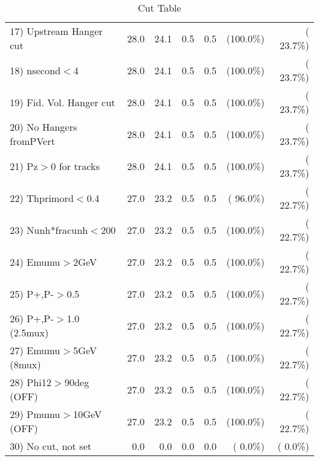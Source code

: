 \begin{table}[h!]
\begin{tabular}{||l||r|r|r|r|r|r||}
 17) Upstream Hanger cut  &         28.0 &         24.1 &          0.5 &          0.5 & (100.0\%) & ( 23.7\%) \\
 18) nsecond$<$4          &         28.0 &         24.1 &          0.5 &          0.5 & (100.0\%) & ( 23.7\%) \\
 19) Fid. Vol. Hanger cut &         28.0 &         24.1 &          0.5 &          0.5 & (100.0\%) & ( 23.7\%) \\
 20) No Hangers fromPVert &         28.0 &         24.1 &          0.5 &          0.5 & (100.0\%) & ( 23.7\%) \\
 21) Pz$>$0 for tracks    &         28.0 &         24.1 &          0.5 &          0.5 & (100.0\%) & ( 23.7\%) \\
 22) Thprimord$<$0.4      &         27.0 &         23.2 &          0.5 &          0.5 & ( 96.0\%) & ( 22.7\%) \\
 23) Nunh*fracunh$<$200   &         27.0 &         23.2 &          0.5 &          0.5 & (100.0\%) & ( 22.7\%) \\
 24) Emumu$>$2GeV         &         27.0 &         23.2 &          0.5 &          0.5 & (100.0\%) & ( 22.7\%) \\
 25) P+,P-$>$0.5          &         27.0 &         23.2 &          0.5 &          0.5 & (100.0\%) & ( 22.7\%) \\
 26) P+,P-$>$1.0 (2.5mux) &         27.0 &         23.2 &          0.5 &          0.5 & (100.0\%) & ( 22.7\%) \\
 27) Emumu$>$5GeV  (8mux) &         27.0 &         23.2 &          0.5 &          0.5 & (100.0\%) & ( 22.7\%) \\
 28) Phi12$>$90deg  (OFF) &         27.0 &         23.2 &          0.5 &          0.5 & (100.0\%) & ( 22.7\%) \\
 29) Pmumu$>$10GeV  (OFF) &         27.0 &         23.2 &          0.5 &          0.5 & (100.0\%) & ( 22.7\%) \\
 30) No cut, not set      &          0.0 &          0.0 &          0.0 &          0.0 & (  0.0\%) & (  0.0\%) \\
 \hline
 \hline
 \end{tabular}
 \caption{Cut Table           }
 \label{tab-cutheavy_neutrino_0.350}
 \end{table}
